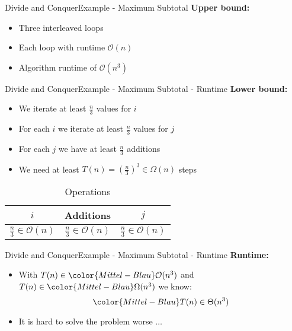 

\begin{frame}{Divide and Conquer}{Example - Maximum Subtotal}
  \textbf{Upper bound:}
  \begin{itemize}
    \item
      Three interleaved loops
    \item
      Each loop with runtime {\color{Mittel-Blau}$\mathcal{O}(n)$}
    \item
      Algorithm runtime of {\color{Mittel-Blau}$\mathcal{O}(n^3)$}
  \end{itemize}
\end{frame}


\begin{frame}{Divide and Conquer}{Example - Maximum Subtotal - Runtime}
  \textbf{Lower bound:}
  \begin{itemize}
    \item
      We iterate at least $\frac{n}{3}$ values for $i$
    \item
      For each $i$ we iterate at least $\frac{n}{3}$ values for $j$
    \item
      For each $j$ we have at least $\frac{n}{3}$ additions
    \item
      We need at least $T(n) = (\frac{n}{3})^3 \in \Omega(n)$ steps
  \end{itemize}
  \begin{table}
    \caption{Operations}
    \label{fig:divide_and_conquer:max_sub_total_operations}
    \begin{tabular}{c|c|c}
      $i$ & Additions & $j$\\
      \midrule
      $\frac{n}{3} \in \mathcal{O}(n)$ &
      $\frac{n}{3} \in \mathcal{O}(n)$ &
      $\frac{n}{3} \in \mathcal{O}(n)$\\
    \end{tabular}
  \end{table}
\end{frame}


\begin{frame}{Divide and Conquer}{Example - Maximum Subtotal - Runtime}
  \textbf{Runtime:}
  \begin{itemize}
    \item
      With $T(n) \in {\color{Mittel-Blau}\mathcal{O}(n^3)}$ and
      $T(n) \in {\color{Mittel-Blau}\Omega(n^3)}$ we know:
      \begin{displaymath}
        \color{Mittel-Blau}
        T(n) \in \Theta(n^3)
      \end{displaymath}
    \item
      It is hard to solve the problem worse $\ldots$
  \end{itemize}
\end{frame}

